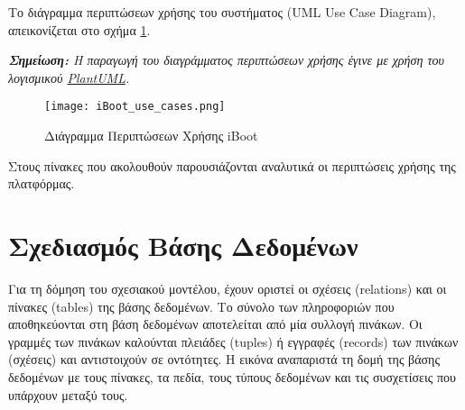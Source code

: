 Το διάγραμμα περιπτώσεων χρήσης του συστήματος (UML Use Case Diagram), απεικονίζεται στο σχήμα \ref{fig:iboot-use-cases}.

\textit{\textbf{Σημείωση:} Η παραγωγή του διαγράμματος περιπτώσεων χρήσης έγινε με χρήση του λογισμικού \href{https://www.plantuml.com/plantuml/uml/fPTRQzn65CUVwqynvDsXqBTIJ9hIba8BXX8eb3x8g_5QM2ijkZI5fk2B4nEm0sxhfnOII4jVOXl5Ndonj_u6Cr-fVvtD-EpPg2DXOuHNi-VyplzSf9rva1T1LfI3MCt5UhbGHQgogBzIg33ATA-8qaJDvQjHCWooOA2IDDIv7ggFFfnUpO9arQsgkM7GMmtwMaKFqxHGFwkv3sfGaFHZhUwPNqrbDysvkJ07TaEPFyp8dDijSssVsdLpR8xCg5x-1pUdTjDksHTcV4y5kIfpdNrH9gGe1nFtlI2lYVjmEuPzPP-PGsMtyV6mTZMdYlvTr_zs9olcobI4owD-KWu5vxNTDMDpOaRGTzgL4wVzA95ox9gf03em5u1T4ynSsEUuGTPOs1LieYodMJyj5eCyVvnceS3z3Tm8k3EekqAf2FVIZErEhO4gH_Lg0Zv2pP9We0Lm3q2e4ia2j6Ptb2V9j2manLpYhqBf3zzL1zgseVG8cOxVpx2tWW7GYrcw7CLIp-yeIzNOm7PXeOvreUiqPwQCeE_qhBkgxTE4LHC6FfDKuWo211FxTR0qErdm977FAL4pcYNKS-kPZY0C0VMcsypiblWiUvzcvLz60bOfciRAd9a3B8oeFLmVP8Zwk2VDLoCTHWK2VXeEegHBjLz2x1jpGl5eYg_D9QvZ5qsK_iiiBOUvB1IbUyvl1gG2Vu8YseR2UZEKwav4N-KxmRZMn6lFkptLpzB1i2nqvXsr1ZrOz0wQuyuyfcEaUERUQSrGCv9JU8ZFgFii6CsNR5IneimzzCaSD_Evk394oq0tl6yQOzzChQFxfi6htlyKChvrE1x6QMzLeTbZok1oyipz1V0QFVNHudUVJutALyEVz5BjufyLaCQuwEU0lheo1sPCGF96zKL0koK2-iVgHiFj6dD7RJSzP1c-9junMhT-ivJsXfi_wuZqeu-sNU3l2BVOsU3QcEfqlLNwHYTb-nlmYe6ZHY1wnhHRjQmj13M4O_ZwuKLnIHdMMb7QwapQVCBH40ZlShj52NGj-hUz5HsMiMx_tR7R3K7Vm8otO9qQuoBUhZ5tLC6zOncUtjqv6hUNuxMtTy-kJy_YQ_iKKTuYC9xRsVrQsfUjUqMAt-Awf9UtGDdDHjIFaNvC85yjsb6Sx0JsItqI2df5cW77ktDN5uJA-FizO5xW0fJgsk3GBtLUF19Ulr7nSQQmE_1fsjA1WIzUeHeLP3w3tJfrpyqZTdAC-r___QODAX5YR0SbXCvYGF13IU_VvfmotO_oGcSwfCHGC2hB9q_cvvquNk1OlCP5WU_4Otx-oS9xOFALtugmDnmOBBYZ8TQdnkp-_ONf_dwiegGNbw6MHWiqJZwBxrUYCDJ93uscdCI2674r9qw_98OEdkpQP29FbUssV63qsegpdD_KdHozDdo8cxQJNQAII5VkJx1487VQOeWqS96yDkAOqsp6JHH8JnV9Y_JoMSSffZiPI1g9yuU_GCALuea3Xmlf5fZMQeeCVDOiixk3s9gt9YRSkSApOJbhtZkxN6vMf31XpCewMy_k2jjJaGWebdj0fzVTCx39aiHsD9MRhJQXmfzaobsJq-aMcDTeIaAxsifzGxjIkPjxe9Em7CJ_0G00}{PlantUML}.}

\begin{figure}[ht]
	\centering
	\texttt{[image: iBoot\_use\_cases.png]}
	\caption{Διάγραμμα Περιπτώσεων Χρήσης iBoot}
	\label{fig:iboot-use-cases}
\end{figure}

\FloatBarrier

Στους πίνακες που ακολουθούν παρουσιάζονται αναλυτικά οι περιπτώσεις χρήσης της πλατφόρμας.

\FloatBarrier

\FloatBarrier

\section{Σχεδιασμός Βάσης Δεδομένων}
Για τη δόμηση του σχεσιακού μοντέλου, έχουν οριστεί οι σχέσεις (relations) και οι πίνακες (tables) της βάσης δεδομένων. Το σύνολο των πληροφοριών που αποθηκεύονται στη βάση δεδομένων αποτελείται από μία συλλογή πινάκων. Οι γραμμές των πινάκων καλούνται πλειάδες (tuples) ή εγγραφές (records) των πινάκων (σχέσεις) και αντιστοιχούν σε οντότητες. Η εικόνα αναπαριστά τη δομή της βάσης δεδομένων με τους πίνακες, τα πεδία, τους τύπους δεδομένων και τις συσχετίσεις που υπάρχουν μεταξύ τους.

